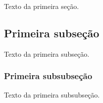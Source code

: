 \documentclass[a4paper,12pt,oneside,onecolumn,final,fleqn]{repUERJ}
\begin{document}
Texto da primeira seção.

\subsection{Primeira subseção}

Texto da primeira subseção.

\subsubsection{Primeira subsubseção}

Texto da primeira subsubseção.


\printindex

\end{document}
